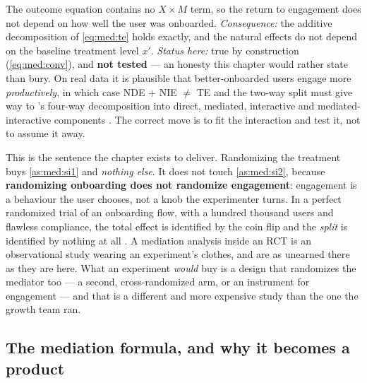 \begin{assumption}\label{as:med:nointer}
The outcome equation contains no $X \times M$ term, so the return to engagement does not depend on
how well the user was onboarded. \emph{Consequence:} the additive decomposition of \cref{eq:med:te}
holds exactly, and the natural effects do not depend on the baseline treatment level $x'$.
\emph{Status here:} true by construction (\cref{eq:med:conv}), and \textbf{not tested} --- an
honesty this chapter would rather state than bury. On real data it is plausible that better-onboarded
users engage more \emph{productively}, in which case NDE $+$ NIE $\neq$ TE and the two-way split must
give way to \citeauthor{vanderweele2014}'s four-way decomposition into direct, mediated,
interactive and mediated-interactive components \citep{vanderweele2014, vanderweele2015}. The
correct move is to fit the interaction and test it, not to assume it away.
\end{assumption}

\begin{remark}
This is the sentence the chapter exists to deliver. Randomizing the treatment buys
\cref{as:med:si1} and \emph{nothing else}. It does not touch \cref{as:med:si2}, because
\textbf{randomizing onboarding does not randomize engagement}: engagement is a behaviour the user
chooses, not a knob the experimenter turns. In a perfect randomized trial of an onboarding flow,
with a hundred thousand users and flawless compliance, the total effect is identified by the coin
flip and the \emph{split} is identified by nothing at all \citep{bullock2010, imai2011}. A
mediation analysis inside an RCT is an observational study wearing an experiment's clothes, and
 are as unearned there as they are here. What an experiment
\emph{would} buy is a design that randomizes the mediator too --- a second, cross-randomized arm, or
an instrument for engagement --- and that is a different and more expensive study than the one the
growth team ran.
\end{remark}

\subsection*{The mediation formula, and why it becomes a product}

